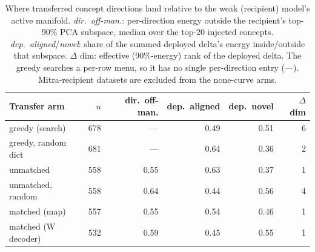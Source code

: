 \begin{table}[t]
\centering
\small
\setlength{\tabcolsep}{5pt}
\begin{tabular}{l r r r r r}
\toprule
Transfer arm & $n$ & dir.\ off-man. & dep.\ aligned & dep.\ novel & $\Delta$ dim \\
\midrule
greedy (search) & 678 & --- & 0.49 & 0.51 & 6 \\
greedy, random dict & 681 & --- & 0.64 & 0.36 & 2 \\
unmatched & 558 & 0.55 & 0.63 & 0.37 & 1 \\
unmatched, random & 558 & 0.64 & 0.44 & 0.56 & 4 \\
matched (map) & 557 & 0.55 & 0.54 & 0.46 & 1 \\
matched (W decoder) & 532 & 0.59 & 0.45 & 0.55 & 1 \\
\bottomrule
\end{tabular}
\caption{%
  Where transferred concept directions land relative to the weak (recipient)   model's active manifold. \emph{dir.\ off-man.}: per-direction energy outside   the recipient's top-90\% PCA subspace, median over the top-20 injected   concepts. \emph{dep.\ aligned}/\emph{novel}: share of the summed deployed   delta's energy inside/outside that subspace. $\Delta$ dim: effective   (90\%-energy) rank of the deployed delta. The greedy searches a per-row   menu, so it has no single per-direction entry (---). Mitra-recipient   datasets are excluded from the none-curve arms.
}
\label{tab:transfer_manifold}
\end{table}